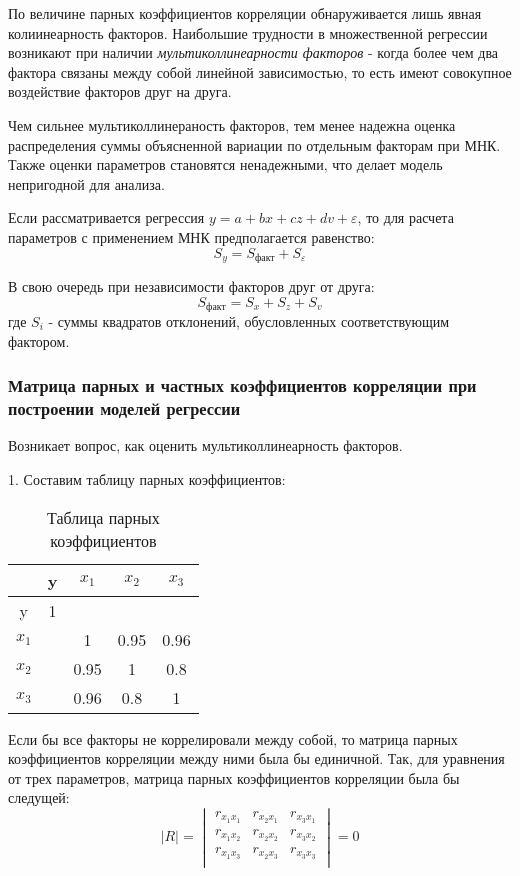 \documentclass[aps,%
12pt,%
final,%
oneside,
onecolumn,%
musixtex, %
superscriptaddress,%
centertags]{article} %
\theoremstyle{plain}
\theoremstyle{definition}
\theoremstyle{remark}
\begin{document}
По величине парных коэффициентов корреляции обнаруживается лишь явная колиинеарность факторов. Наибольшие трудности в множественной регрессии возникают при наличии \textit{мультиколлинеарности факторов} - когда более чем два фактора связаны между собой линейной зависимостью, то есть имеют совокупное воздействие факторов друг на друга.

Чем сильнее мультиколлинераность факторов, тем менее надежна оценка распределения суммы объясненной вариации по отдельным факторам при МНК. Также оценки параметров становятся ненадежными, что делает модель непригодной для анализа.

Если рассматривается регрессия $y=a+bx+cz+dv+\varepsilon$, то для расчета параметров с применением МНК предполагается равенство:
$$S_y = S_{\text{факт}} + S_{\varepsilon}$$

В свою очередь при независимости факторов друг от друга:
$$S_{\text{факт}} = S_x + S_z + S_v$$
где $S_i$ - суммы квадратов отклонений, обусловленных соответствующим фактором.

\subsubsection{Матрица парных и частных коэффициентов корреляции при построении моделей регрессии }

Возникает вопрос, как оценить мультиколлинеарность факторов. 

1. Составим таблицу парных коэффициентов:
\begin{table}[H]
	\begin{center}
		\begin{tabular}{|c|c|c|c|c|} \hline
		& y & $x_1$ & $x_2$ & $x_3$ \\ \hline
		y & 1 &  &  &   \\ \hline
		$x_1$ &  & 1 & 0.95 & 0.96 \\ \hline
		$x_2$ &  & 0.95 & 1 & 0.8 \\ \hline
		$x_3$ &  & 0.96 & 0.8 & 1 \\ \hline
		\end{tabular}
	\caption{Таблица парных коэффициентов}
	\end{center}
\end{table}

Если бы все факторы не коррелировали между собой, то матрица парных коэффициентов корреляции между ними была бы единичной. Так, для уравнения от трех параметров, матрица парных коэффициентов корреляции была бы следущей:
$$|R| = \begin{vmatrix}
	r_{x_1x_1} & r_{x_2x_1} & r_{x_3x_1} \\
	r_{x_1x_2} & r_{x_2x_2} & r_{x_3x_2} \\
	r_{x_1x_3} & r_{x_2x_3} & r_{x_3x_3} \\
\end{vmatrix} = 0
$$
\end{document}
